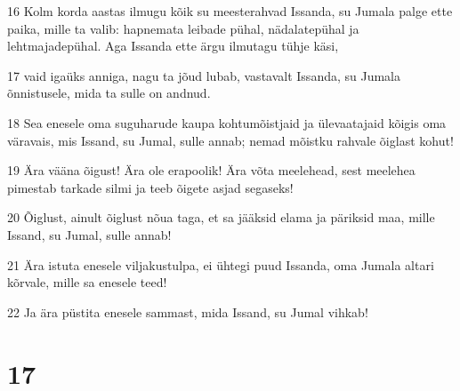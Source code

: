 \par 16 Kolm korda aastas ilmugu kõik su meesterahvad Issanda, su Jumala palge ette paika, mille ta valib: hapnemata leibade pühal, nädalatepühal ja lehtmajadepühal. Aga Issanda ette ärgu ilmutagu tühje käsi,
\par 17 vaid igaüks anniga, nagu ta jõud lubab, vastavalt Issanda, su Jumala õnnistusele, mida ta sulle on andnud.
\par 18 Sea enesele oma suguharude kaupa kohtumõistjaid ja ülevaatajaid kõigis oma väravais, mis Issand, su Jumal, sulle annab; nemad mõistku rahvale õiglast kohut!
\par 19 Ära vääna õigust! Ära ole erapoolik! Ära võta meelehead, sest meelehea pimestab tarkade silmi ja teeb õigete asjad segaseks!
\par 20 Õiglust, ainult õiglust nõua taga, et sa jääksid elama ja päriksid maa, mille Issand, su Jumal, sulle annab!
\par 21 Ära istuta enesele viljakustulpa, ei ühtegi puud Issanda, oma Jumala altari kõrvale, mille sa enesele teed!
\par 22 Ja ära püstita enesele sammast, mida Issand, su Jumal vihkab!

\chapter{17}

